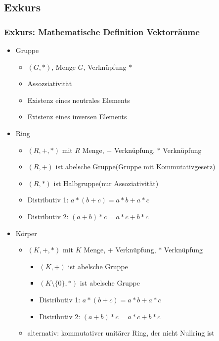 \subsection{Exkurs}
\begin{frame}
    \frametitle{Exkurs: Mathematische Definition Vektorräume}
    \begin{itemize}
        \item Gruppe
        \begin{itemize}
            \item $(G,*)$, Menge $G$, Verknüpfung $*$
            \item Assozsiativität
            \item Existenz eines neutrales Elements
            \item Existenz eines inversen Elements
        \end{itemize}
        \item Ring
        \begin{itemize}
            \item $(R,+,*)$ mit $R$ Menge, $+$ Verknüpfung, $*$ Verknüpfung
            \item $(R,+)$ ist abelsche Gruppe(Gruppe mit Kommutativgesetz)
            \item $(R,*)$ ist Halbgruppe(nur Assoziativität)
            \item Distributiv 1: $a * (b + c) = a * b + a * c$
            \item Distributiv 2: $(a + b) * c = a * c + b * c$
        \end{itemize}
        \item Körper
        \begin{itemize}
            \item $(K,+,*)$ mit $K$ Menge, $+$ Verknüpfung, $*$ Verknüpfung
            \begin{itemize}
                \item $(K,+)$ ist abelsche Gruppe
                \item $(K\setminus\{0\},*)$ ist abelsche Gruppe
                \item Distributiv 1: $a * (b + c) = a * b + a * c$
                \item Distributiv 2: $(a + b) * c = a * c + b * c$
            \end{itemize}
            \item alternativ: kommutativer unitärer Ring, der nicht Nullring ist
        \end{itemize}
    \end{itemize}
\end{frame}


